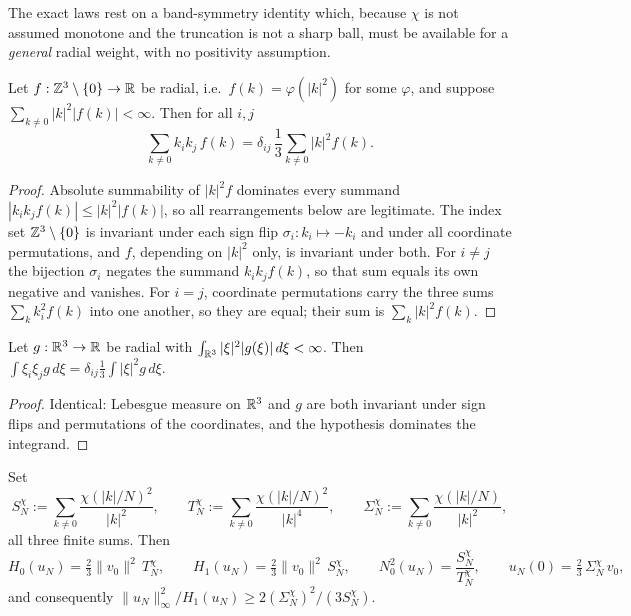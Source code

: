 The exact laws rest on a band-symmetry identity which, because $\chi$ is
not assumed monotone and the truncation is not a sharp ball, must be
available for a \emph{general} radial weight, with no positivity
assumption.

\begin{lemma}
\label{app:bandsym}
Let $f:\mathbb Z^3\setminus\{0\}\to\mathbb R$ be radial, i.e.\ $f(k)=\varphi(|k|^2)$
for some $\varphi$, and suppose $\sum_{k\neq0}|k|^2|f(k)|<\infty$. Then
for all $i,j$
\[
\sum_{k\neq0}k_ik_j\,f(k)
=\delta_{ij}\,\frac13\sum_{k\neq0}|k|^2f(k).
\]
\end{lemma}

\begin{proof}
Absolute summability of $|k|^2f$ dominates every summand
$|k_ik_jf(k)|\le|k|^2|f(k)|$, so all rearrangements below are
legitimate. The index set $\mathbb Z^3\setminus\{0\}$ is invariant under each
sign flip $\sigma_i:k_i\mapsto-k_i$ and under all coordinate
permutations, and $f$, depending on $|k|^2$ only, is invariant under
both. For $i\neq j$ the bijection $\sigma_i$ negates the summand
$k_ik_jf(k)$, so that sum equals its own negative and vanishes. For
$i=j$, coordinate permutations carry the three sums $\sum_kk_i^2f(k)$
into one another, so they are equal; their sum is $\sum_k|k|^2f(k)$.
\end{proof}

\begin{lemma}\label{app:bandsymcont}
Let $g:\mathbb R^3\to\mathbb R$ be radial with $\int_{\mathbb R^3}|\xi|^2|g(\xi)|\,d\xi<\infty$.
Then $\int\xi_i\xi_jg\,d\xi=\delta_{ij}\frac13\int|\xi|^2g\,d\xi$.
\end{lemma}

\begin{proof}
Identical: Lebesgue measure on $\mathbb R^3$ and $g$ are both invariant under
sign flips and permutations of the coordinates, and the hypothesis
dominates the integrand.
\end{proof}

\begin{theorem}\label{app:exactlaws}
Set
\[
S_N^\chi:=\sum_{k\neq0}\frac{\chi(|k|/N)^2}{|k|^2},\qquad
T_N^\chi:=\sum_{k\neq0}\frac{\chi(|k|/N)^2}{|k|^4},\qquad
\Sigma_N^\chi:=\sum_{k\neq0}\frac{\chi(|k|/N)}{|k|^2},
\]
all three finite sums. Then
\[
H_0(u_N)=\tfrac23\|v_0\|^2\,T_N^\chi,\qquad
H_1(u_N)=\tfrac23\|v_0\|^2\,S_N^\chi,\qquad
N_0^2(u_N)=\frac{S_N^\chi}{T_N^\chi},\qquad
u_N(0)=\tfrac23\,\Sigma_N^\chi\,v_0 ,
\]
and consequently
$\|u_N\|_\infty^2/H_1(u_N)\ge 2(\Sigma_N^\chi)^2/(3S_N^\chi)$.
\end{theorem}

